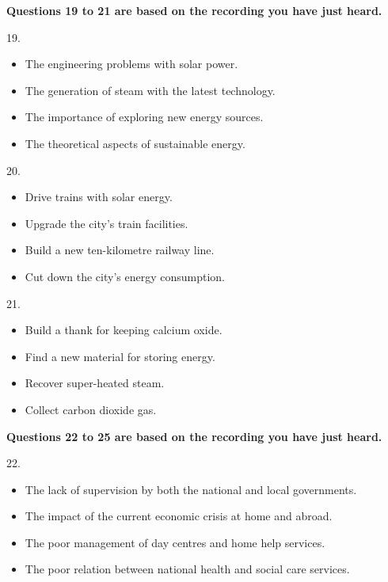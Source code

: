 \documentclass[UTF8,11pt]{ctexart}
\begin{document}
\textbf{Questions 19 to 21 are based on the recording you have just heard.}


19.


\begin{itemize}[leftmargin=2em,itemsep=.2em,topsep=.4em]\item[A.] The engineering problems with solar power.
\item[B.] The generation of steam with the latest technology.
\item[C.] The importance of exploring new energy sources.
\item[D.] The theoretical aspects of sustainable energy.
\end{itemize}

20.


\begin{itemize}[leftmargin=2em,itemsep=.2em,topsep=.4em]\item[A.] Drive trains with solar energy.
\item[B.] Upgrade the city’s train facilities.
\item[C.] Build a new ten-kilometre railway line.
\item[D.] Cut down the city’s energy consumption.
\end{itemize}

21.


\begin{itemize}[leftmargin=2em,itemsep=.2em,topsep=.4em]\item[A.] Build a thank for keeping calcium oxide.
\item[B.] Find a new material for storing energy.
\item[C.] Recover super-heated steam.
\item[D.] Collect carbon dioxide gas.
\end{itemize}

\textbf{Questions 22 to 25 are based on the recording you have just heard.}


22.


\begin{itemize}[leftmargin=2em,itemsep=.2em,topsep=.4em]\item[A.] The lack of supervision by both the national and local governments.
\item[B.] The impact of the current economic crisis at home and abroad.
\item[C.] The poor management of day centres and home help services.
\item[D.] The poor relation between national health and social care services.
\end{itemize}
\end{document}
